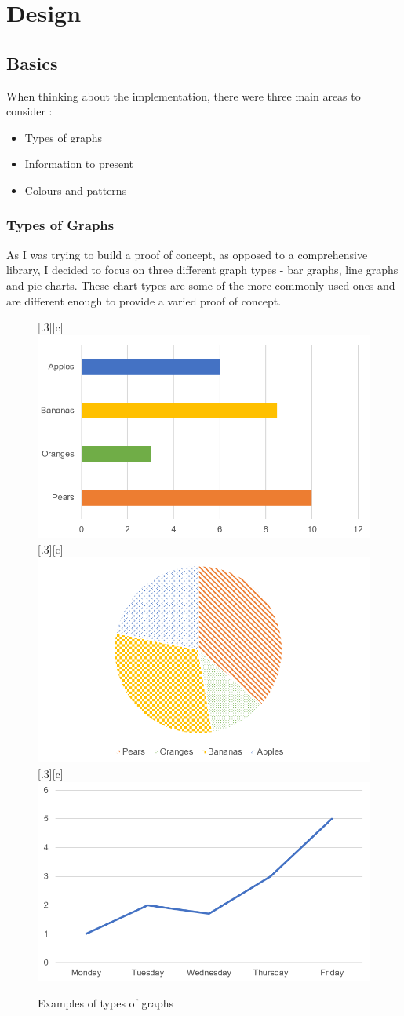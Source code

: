 \documentclass[ %
                    author={Aleena Baig},
                supervisor={Dr Simon Lock},
                    degree={BSc},
                     title={On Making Web Accessible Graphs},
                  subtitle={},
                      year={2019} ]{dissertation}
\begin{document}
\chapter{Design}

\section{Basics}

When thinking about the implementation, there were three main areas to consider :

\begin{itemize}
    \item Types of graphs
    \item Information to present
    \item Colours and patterns
\end{itemize}

\subsection{Types of Graphs}

As I was trying to build a proof of concept, as opposed to a comprehensive library, I decided to focus on three different graph types - bar graphs, line graphs and pie charts. These chart types are some of the more commonly-used ones and are different enough to provide a varied proof of concept.

\newline
\begin{figure}[H]
  \centering
  [.3\linewidth][c]{%
    \includegraphics[width=.3\linewidth]{images/BarGraph.PNG}}\quad
  [.3\linewidth][c]{%
    \includegraphics[width=.3\linewidth]{images/PieGraph.PNG}}\quad
  [.3\linewidth][c]{%
    \includegraphics[width=.3\linewidth]{images/LineGraph.PNG}}
  \caption{Examples of types of graphs}    
\end{figure}
\end{document}
